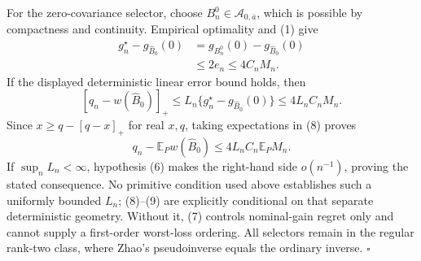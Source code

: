 For the zero-covariance selector, choose \(B_n^0\in\mathcal A_{0,\overline a}\), which is possible by compactness and continuity.  Empirical optimality and (1) give
\[
\begin{aligned}
g_n^\star-g_{\widehat B_0}(0)
&=g_{B_n^0}(0)-g_{\widehat B_0}(0)\\
&\le2e_n
\le4C_nM_n.
\end{aligned}
\tag{7}
\]
If the displayed deterministic linear error bound holds, then
\[
[q_n-w(\widehat B_0)]_+
\le L_n\{g_n^\star-g_{\widehat B_0}(0)\}
\le4L_nC_nM_n.
\tag{8}
\]
Since \(x\ge q-[q-x]_+\) for real \(x,q\), taking expectations in (8) proves
\[
q_n-\mathbb E_Pw(\widehat B_0)
\le4L_nC_n\mathbb E_PM_n.
\tag{9}
\]
If \(\sup_nL_n<\infty\), hypothesis (6) makes the right-hand side \(o(n^{-1})\), proving the stated consequence.  No primitive condition used above establishes such a uniformly bounded \(L_n\); (8)--(9) are explicitly conditional on that separate deterministic geometry.  Without it, (7) controls nominal-gain regret only and cannot supply a first-order worst-loss ordering.  All selectors remain in the regular rank-two class, where Zhao's pseudoinverse equals the ordinary inverse. \(\square\)